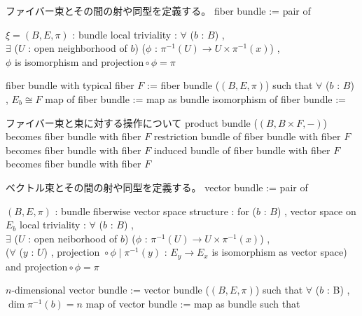 \begin{Definition}
\itemnote
  ファイバー束とその間の射や同型を定義する。
\itemdefi
  \Define fiber bundle := pair of
  \begin{itemize}
    \itemenum \(\xi = (B , E , \pi)\) : bundle
    \itemwith local triviality :
      \(\forall\) (\(b\) : \(B\)) ,\\
      \(\exists\) (\(U\) : open neighborhood of \(b\)) (\(\phi\) : \(\pi^{-1}(U) \to U \times \pi^{-1}(x)\)) , \\
      \(\phi\) is isomorphism and \(\text{projection} \circ \phi = \pi\)
  \end{itemize}
\itemdefi
  \Define fiber bundle with typical fiber \(F\) := fiber bundle (\((B , E , \pi)\)) such that \(\forall\) (\(b\) : \(B\)) , \(E_b \cong F\)
\itemdefi
  \Define map of fiber bundle := map as bundle
\itemdefi
  \Define isomorphism of fiber bundle := 
\end{Definition}

\begin{Theorem}
\itemnote
  ファイバー束と束に対する操作について
\itemprop
  product bundle (\((B , B \times F , -)\)) becomes fiber bundle with fiber \(F\)
\itemprop
  restriction bundle of fiber bundle with fiber \(F\) becomes fiber bundle with fiber \(F\)
\itemprop
  induced bundle of fiber bundle with fiber \(F\) becomes fiber bundle with fiber \(F\)
\end{Theorem}

\begin{Definition}
\itemnote
  ベクトル束とその間の射や同型を定義する。
\itemdefi
  \Define vector bundle := pair of
  \begin{itemize}
    \itemenum \((B , E , \pi)\) : bundle
    \itemenum fiberwise vector space structure :
      for (\(b\) : \(B\)) , vector space on \(E_b\)
    \itemwith local triviality :
      \(\forall\) (\(b\) : \(B\)) ,\\
      \(\exists\) (\(U\) : open neiborhood of \(b\)) (\(\phi\) : \(\pi^{-1}(U) \to U \times \pi^{-1}(x)\)) , \\
      (\(\forall\) (\(y\) : \(U\)) , \(\text{projection } \circ \phi \mid \pi^{-1}(y)\) : \(E_y \to E_x\) is isomorphism as vector space) and \(\text{projection} \circ \phi = \pi\)
  \end{itemize}
\itemdefi
  \Define \(n\)-dimensional vector bundle :=
  vector bundle (\((B , E , \pi)\)) such that \(\forall\) (\(b\) : B) , \(\dim \pi^{-1}(b) = n\)
\itemdefi
  \Define map of vector bundle := map as bundle such that 
\end{Definition}

